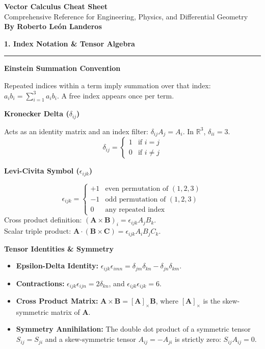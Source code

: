 \documentclass[10pt, landscape, twocolumn]{article}
\newcommand{\cheatsheetsection}[1]{
    \vspace{0.8em}
    {\color{themeblue}\large\bfseries #1} \par
    \vspace{-0.4em}
    {\color{themeblue}\rule{\linewidth}{1pt}} \par
    \vspace{0.3em}
}
\newcommand{\cheatsheetsubsection}[1]{
    \vspace{0.5em}
    {\color{themeblue}\normalsize\bfseries #1} \par
    \vspace{0.2em}
}
\begin{document}
\begin{center}
    \vspace{-1em}
    {\color{themeblue}\huge\bfseries Vector Calculus Cheat Sheet}\\[0.3em]
    {\color{themegray}\small Comprehensive Reference for Engineering, Physics, and Differential Geometry}\\[0.4em]
    {\color{themegray}\footnotesize \textbf{By Roberto León Landeros}}
\end{center}
\vspace{-1em}

\cheatsheetsection{1. Index Notation \& Tensor Algebra}

\cheatsheetsubsection{Einstein Summation Convention}
Repeated indices within a term imply summation over that index: $a_i b_i = \sum_{i=1}^3 a_i b_i$. A free index appears once per term.

\cheatsheetsubsection{Kronecker Delta ($\delta_{ij}$)}
Acts as an identity matrix and an index filter: $\delta_{ij} A_j = A_i$. In $\mathbb{R}^3$, $\delta_{ii} = 3$.
\[
\delta_{ij} = \begin{cases} 
1 & \text{if } i = j \\ 
0 & \text{if } i \neq j 
\end{cases}
\]

\cheatsheetsubsection{Levi-Civita Symbol ($\epsilon_{ijk}$)}
\[
\epsilon_{ijk} = \begin{cases} 
+1 & \text{even permutation of } (1,2,3) \\ 
-1 & \text{odd permutation of } (1,2,3) \\ 
0 & \text{any repeated index} 
\end{cases}
\]
Cross product definition: $(\mathbf{A} \times \mathbf{B})_i = \epsilon_{ijk} A_j B_k$. \\
Scalar triple product: $\mathbf{A} \cdot (\mathbf{B} \times \mathbf{C}) = \epsilon_{ijk} A_i B_j C_k$.

\cheatsheetsubsection{Tensor Identities \& Symmetry}
\begin{itemize}[leftmargin=*, nosep]
    \item \textbf{Epsilon-Delta Identity:} $\epsilon_{ijk}\epsilon_{imn} = \delta_{jm}\delta_{kn} - \delta_{jn}\delta_{km}$.
    \item \textbf{Contractions:} $\epsilon_{ijk}\epsilon_{ijn} = 2\delta_{kn}$, and $\epsilon_{ijk}\epsilon_{ijk} = 6$.
    \item \textbf{Cross Product Matrix:} $\mathbf{A} \times \mathbf{B} = [\mathbf{A}]_\times \mathbf{B}$, where $[\mathbf{A}]_\times$ is the skew-symmetric matrix of $\mathbf{A}$.
    \item \textbf{Symmetry Annihilation:} The double dot product of a symmetric tensor $S_{ij} = S_{ji}$ and a skew-symmetric tensor $A_{ij} = -A_{ji}$ is strictly zero: $S_{ij}A_{ij} = 0$.
\end{itemize}
\end{document}
